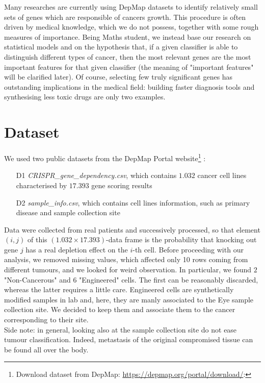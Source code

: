 \documentclass[a4paper,11pt, oneside]{article}  %
\begin{document}
Many researches are currently using DepMap datasets to identify relatively small sets of genes which are responsible of cancers growth. This procedure is often driven by medical knowledge,  which we do not possess,  together with some rough measures of importance.  Being Maths student,  we instead base our research on statistical models and on the hypothesis that, if a given classifier is able to distinguish different types of cancer, then the most relevant genes are the most important features for that given classifier (the meaning of "important features" will be clarified later). Of course, selecting few truly significant genes has outstanding implications in the medical field: building faster diagnosis tools and synthesising less toxic drugs are only two examples. 


\section{Dataset}
We used two public datasets from the DepMap Portal website\footnote{Download dataset from DepMap:  \url{https://depmap.org/portal/download/}:} :
\begin{itemize}
	\item[D1] \textit{CRISPR\_gene\_dependency.csv},  which contains $1.032$ cancer cell lines characterised by $17.393$ gene scoring results
	\item[D2] \textit{sample\_info.csv}, which contains cell lines information,  such as primary disease and sample collection site
\end{itemize}
Data were collected from real patients and successively processed,  so that element $(i, j)$ of this $(1.032 \times 17.393)$-data frame is the probability that knocking out gene $j$ has a real depletion effect on the $i$-th cell.
Before proceeding with our analysis, we removed missing values, which affected only 10 rows coming from different tumours, and we looked for weird observation. In particular, we found $2$ "Non-Cancerous" and $6$ "Engineered" cells. The first can be reasonably discarded, whereas the latter requires a little care. Engineered cells are synthetically modified samples in lab and, here, they are manly associated to the Eye sample collection site. We decided to keep them and associate them to the cancer corresponding to their site. \\
Side note: in general, looking also at the sample collection site do not ease tumour classification. Indeed, metastasis of the original compromised tissue can be found all over the body. \\
\end{document}
